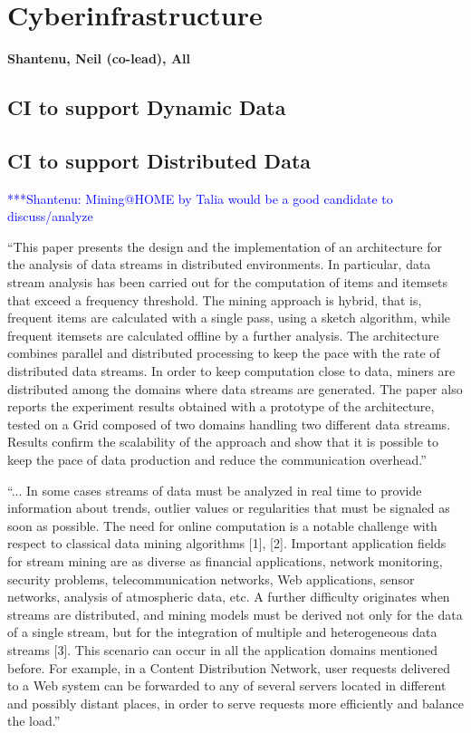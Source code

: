 \documentclass[preprint,12pt]{article}
\newcommand{\jhanote}[1]{  {\textcolor{blue}     { ***Shantenu: #1 }}}
\newcommand{\jhanote}[1]{}
\begin{document}
\section{Cyberinfrastructure} {\bf Shantenu, Neil (co-lead), All}

\subsection{CI to support Dynamic Data}

\subsection{CI to support Distributed Data}

\jhanote{Mining@HOME by Talia would be a good candidate to
  discuss/analyze}

``This paper presents the design and the implementation of an
architecture for the analysis of data streams in distributed
environments. In particular, data stream analysis has been carried out
for the computation of items and itemsets that exceed a frequency
threshold. The mining approach is hybrid, that is, frequent items are
calculated with a single pass, using a sketch algorithm, while
frequent itemsets are calculated offline by a further analysis. The
architecture combines parallel and distributed processing to keep the
pace with the rate of distributed data streams. In order to keep
computation close to data, miners are distributed among the domains
where data streams are generated. The paper also reports the
experiment results obtained with a prototype of the architecture,
tested on a Grid composed of two domains handling two different data
streams. Results confirm the scalability of the approach and show that
it is possible to keep the pace of data production and reduce the
communication overhead.''

``... In some cases streams of data must be analyzed in real time to
provide information about trends, outlier values or regularities that
must be signaled as soon as possible.  The need for online computation
is a notable challenge with respect to classical data mining
algorithms [1], [2].  Important application fields for stream mining
are as diverse as financial applications, network monitoring, security
problems, telecommunication networks, Web applications, sensor
networks, analysis of atmospheric data, etc.  A further difficulty
originates when streams are distributed, and mining models must be
derived not only for the data of a single stream, but for the
integration of multiple and heterogeneous data streams [3]. This
scenario can occur in all the application domains mentioned
before. For example, in a Content Distribution Network, user requests
delivered to a Web system can be forwarded to any of several servers
located in different and possibly distant places, in order to serve
requests more efficiently and balance the load.''
\end{document}
